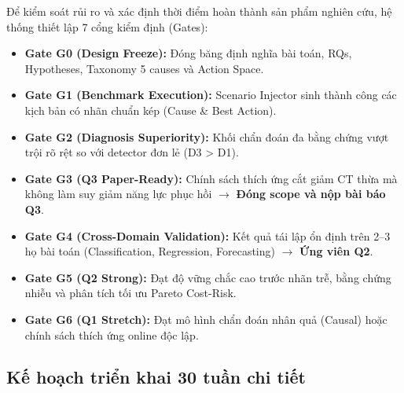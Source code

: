 Để kiểm soát rủi ro và xác định thời điểm hoàn thành sản phẩm nghiên cứu, hệ thống thiết lập 7 cổng kiểm định (Gates):
\begin{itemize}
  \item \textbf{Gate G0 (Design Freeze):} Đóng băng định nghĩa bài toán, RQs, Hypotheses, Taxonomy 5 causes và Action Space.
  \item \textbf{Gate G1 (Benchmark Execution):} Scenario Injector sinh thành công các kịch bản có nhãn chuẩn kép (Cause \& Best Action).
  \item \textbf{Gate G2 (Diagnosis Superiority):} Khối chẩn đoán đa bằng chứng vượt trội rõ rệt so với detector đơn lẻ (D3 > D1).
  \item \textbf{Gate G3 (Q3 Paper-Ready):} Chính sách thích ứng cắt giảm CT thừa mà không làm suy giảm năng lực phục hồi $\rightarrow$ \textbf{Đóng scope và nộp bài báo Q3}.
  \item \textbf{Gate G4 (Cross-Domain Validation):} Kết quả tái lập ổn định trên 2--3 họ bài toán (Classification, Regression, Forecasting) $\rightarrow$ \textbf{Ứng viên Q2}.
  \item \textbf{Gate G5 (Q2 Strong):} Đạt độ vững chắc cao trước nhãn trễ, bằng chứng nhiễu và phân tích tối ưu Pareto Cost-Risk.
  \item \textbf{Gate G6 (Q1 Stretch):} Đạt mô hình chẩn đoán nhân quả (Causal) hoặc chính sách thích ứng online độc lập.
\end{itemize}

\subsection{Kế hoạch triển khai 30 tuần chi tiết}

